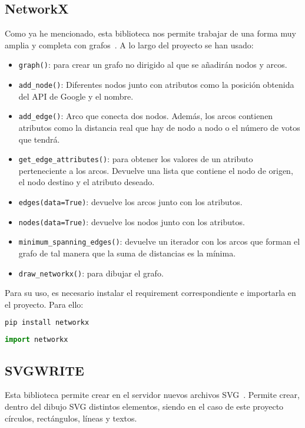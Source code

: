 \subsection{NetworkX}\label{networkx}
Como ya he mencionado, esta biblioteca nos permite trabajar de una forma muy amplia y completa con grafos~\cite{doc:networkx}. A lo largo del proyecto se han usado:
\begin{itemize}
	\item \texttt{graph()}: para crear un grafo no dirigido al que se añadirán nodos y arcos.
	\item \texttt{add\_node()}: Diferentes nodos junto con atributos como la posición obtenida del API de Google y el nombre.
	\item \texttt{add\_edge()}: Arco que conecta dos nodos. Además, los arcos contienen atributos como la distancia real que hay de nodo a nodo o el número de votos que tendrá.
	\item \texttt{get\_edge\_attributes()}: para obtener los valores de un atributo perteneciente a los arcos. Devuelve una lista que contiene el nodo de origen, el nodo destino y el atributo deseado.
	\item \texttt{edges(data=True)}: devuelve los arcos junto con los atributos.
	\item \texttt{nodes(data=True)}: devuelve los nodos junto con los atributos.
	\item \texttt{minimum\_spanning\_edges()}: devuelve un iterador con los arcos que forman el grafo de tal manera que la suma de distancias es la mínima.
	\item \texttt{draw\_networkx()}: para dibujar el grafo.
\end{itemize}

Para su uso, es necesario instalar el requirement correspondiente e importarla en el proyecto. Para ello:
\renewcommand{\lstlistingname}{NetworkX}
\renewcommand{\lstlistlistingname}{List of \lstlistingname s}
\begin{lstlisting}[language=python,caption={Instalación mediante pip.}]
pip install networkx
\end{lstlisting}
\begin{lstlisting}[language=python,caption={Importación.}]
import networkx
\end{lstlisting}

\subsection{SVGWRITE}\label{svgwrite}
Esta biblioteca permite crear en el servidor nuevos archivos SVG~\cite{doc:svgwritedocs}. Permite crear, dentro del dibujo SVG distintos elementos, siendo en el caso de este proyecto círculos, rectángulos, líneas y textos. 

